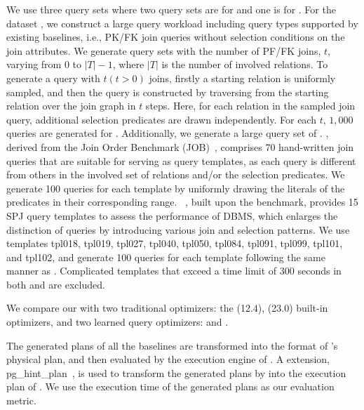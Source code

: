 We use three query sets where two query sets are for \IMDB and one is for \tpcds. For the dataset \imdb, we construct a large query workload including query types supported by existing baselines, i.e., PK/FK join queries without selection conditions on the join attributes. We generate query sets with the number of PF/FK joins, $t$, varying from $0$ to $|T| -1$, where $|T|$ is the number of involved relations. 
To generate a query with $t (t > 0)$ joins, firstly a starting relation is uniformly sampled, and then the query is constructed by traversing from the starting relation over the join graph in $t$ steps. 
Here, for each relation in the sampled join query, additional selection predicates are drawn independently. 
For each $t$, $1,000$ queries are generated for \imdb.
Additionally, we generate a large query set of \job. \job, derived from the Join Order Benchmark (JOB)~\cite{DBLP:journals/pvldb/LeisGMBK015}, comprises 70 hand-written join queries that are suitable for serving as query templates, as each query is different from others in the involved set of relations and/or the selection predicates. 
We generate 100 queries for each template by uniformly drawing the literals of the predicates in their corresponding range.  
\dsb~\cite{ding2021dsb}, built upon the \tpcds benchmark, provides 15 SPJ query templates to assess the performance of DBMS, which enlarges the distinction of queries by introducing various join and selection patterns.  
We use templates tpl018, tpl019, tpl027, tpl040, tpl050, tpl084, tpl091, tpl099, tpl101, and tpl102, and generate 100 queries for each template following the same manner as \job. 
Complicated templates that exceed a time limit of 300 seconds in both \Postgres and \Oracle are excluded. 

We compare our \LLMQO with two traditional optimizers: the \Postgres (12.4), \Oracle (23.0) built-in optimizers, and two learned query optimizers: \bao and \hybrid.

The generated plans of all the baselines are transformed into the format of \Postgres's physical plan, and then evaluated by the execution engine of \Postgres.
A \Postgres extension, pg\_hint\_plan~\cite{takaya2001nippon},
is used to transform the generated plans by \LLMQO into the execution plan of \Postgres. 
We use the execution time of the generated plans as our evaluation metric. 

